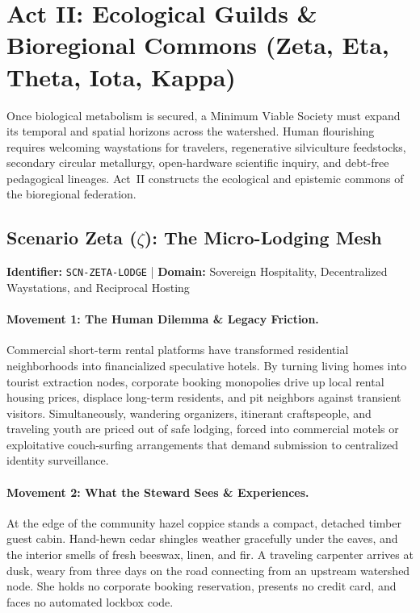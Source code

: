 \section{Act II: Ecological Guilds \& Bioregional Commons (Zeta, Eta, Theta, Iota, Kappa)}
\label{sec:act_2_culture}

Once biological metabolism is secured, a Minimum Viable Society must expand its temporal and spatial horizons across the watershed. Human flourishing requires welcoming waystations for travelers, regenerative silviculture feedstocks, secondary circular metallurgy, open-hardware scientific inquiry, and debt-free pedagogical lineages. Act~II constructs the ecological and epistemic commons of the bioregional federation.

\subsection{Scenario Zeta (\texorpdfstring{$\zeta$}{Zeta}): The Micro-Lodging Mesh}
\label{subsec:scn_zeta}
\textbf{Identifier:} \texttt{SCN-ZETA-LODGE} \quad | \quad \textbf{Domain:} Sovereign Hospitality, Decentralized Waystations, and Reciprocal Hosting

\paragraph{Movement 1: The Human Dilemma \& Legacy Friction.}
Commercial short-term rental platforms have transformed residential neighborhoods into financialized speculative hotels. By turning living homes into tourist extraction nodes, corporate booking monopolies drive up local rental housing prices, displace long-term residents, and pit neighbors against transient visitors. Simultaneously, wandering organizers, itinerant craftspeople, and traveling youth are priced out of safe lodging, forced into commercial motels or exploitative couch-surfing arrangements that demand submission to centralized identity surveillance.

\paragraph{Movement 2: What the Steward Sees \& Experiences.}
At the edge of the community hazel coppice stands a compact, detached timber guest cabin. Hand-hewn cedar shingles weather gracefully under the eaves, and the interior smells of fresh beeswax, linen, and fir. A traveling carpenter arrives at dusk, weary from three days on the road connecting from an upstream watershed node. She holds no corporate booking reservation, presents no credit card, and faces no automated lockbox code. 

